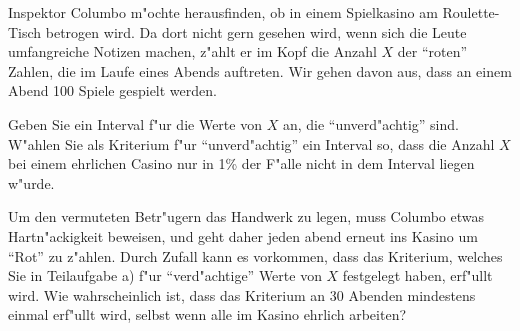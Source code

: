 Inspektor Columbo m"ochte herausfinden, ob in einem Spielkasino
am Roulette-Tisch betrogen wird.
Da dort nicht gern gesehen wird, wenn sich die Leute umfangreiche Notizen
machen, z"ahlt er im Kopf die Anzahl $X$ der ``roten'' Zahlen,
die im Laufe eines Abends auftreten.
Wir gehen davon aus, dass an einem Abend 100 Spiele gespielt werden.
\begin{teilaufgaben}
\item Geben Sie ein Interval f"ur die Werte von $X$ an, die ``unverd"achtig''
sind. W"ahlen Sie als Kriterium f"ur ``unverd"achtig'' ein Interval so, dass
die Anzahl $X$ bei einem ehrlichen Casino nur in 1\% der F"alle nicht
in dem Interval liegen w"urde.
\item Um den vermuteten Betr"ugern das Handwerk zu legen, muss Columbo
etwas Hartn"ackigkeit beweisen, und geht daher jeden abend erneut
ins Kasino um ``Rot'' zu z"ahlen. Durch Zufall kann es vorkommen, dass
das Kriterium, welches Sie in Teilaufgabe a) f"ur ``verd"achtige''
Werte von $X$ festgelegt haben, erf"ullt wird. Wie wahrscheinlich ist,
dass das Kriterium an 30 Abenden mindestens einmal erf"ullt wird, selbst
wenn alle im Kasino ehrlich arbeiten?
\end{teilaufgaben}

